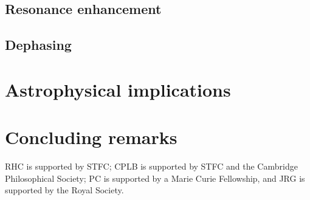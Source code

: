 \documentclass[aps,prd,amsfonts,amssymb,amsmath,nofootinbib,reprint,showpacs]{revtex4-1}
\begin{document}
\subsection{Resonance enhancement}

\subsection{Dephasing}

\section{Astrophysical implications}


\section{Concluding remarks}

\begin{acknowledgments}
RHC is supported by STFC; CPLB is supported by STFC and the Cambridge Philosophical Society; PC is supported by a Marie Curie Fellowship, and JRG is supported by the Royal Society.
\end{acknowledgments}


\end{document}
